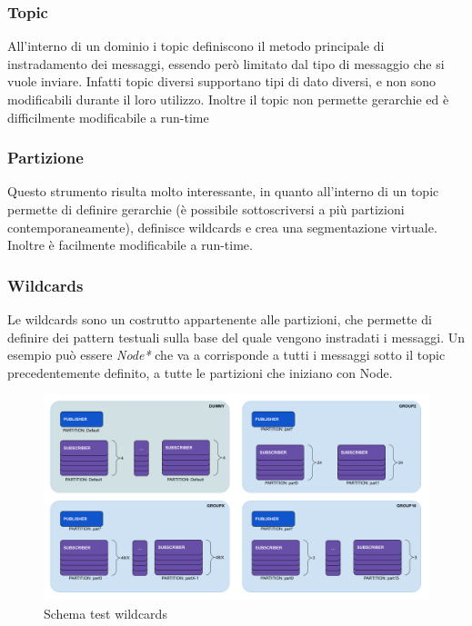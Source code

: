 \subsubsection{Topic}
All'interno di un dominio i topic definiscono il metodo principale di instradamento dei messaggi, essendo però limitato dal tipo di messaggio che si vuole inviare. Infatti topic diversi supportano tipi di dato diversi, e non sono modificabili durante il loro utilizzo.
Inoltre il topic non permette gerarchie ed è difficilmente modificabile a run-time %

\subsubsection{Partizione}
Questo strumento risulta molto interessante, in quanto all'interno di un topic permette di definire gerarchie (è possibile sottoscriversi a più partizioni contemporaneamente), definisce wildcards e crea una segmentazione virtuale. Inoltre è facilmente modificabile a run-time.

\subsubsection{Wildcards}
Le wildcards sono un costrutto appartenente alle partizioni, che permette di definire dei pattern testuali sulla base del quale vengono instradati i messaggi. Un esempio può essere \textit{Node*} che va a corrisponde a tutti i messaggi sotto il topic precedentemente definito, a tutte le partizioni che iniziano con Node.

\begin{figure}[H]
    \includegraphics[width=\textwidth]{./img/wildcards.png}
    \caption{Schema test wildcards}\label{fig:test_UML_wildcards}
\end{figure} 


